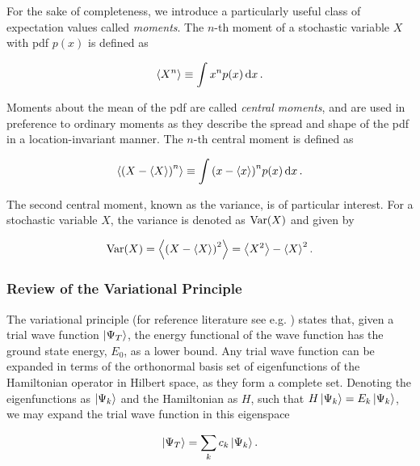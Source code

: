 For the sake of completeness, we introduce a particularly useful class of expectation values called \textit{moments}. The $n$-th moment of a stochastic variable $X$ with pdf $p(x)$ is defined as 

\begin{equation*}
    \expval{X^n} \equiv \int x^n p(x) \dd{x}.
\end{equation*}

Moments about the mean of the pdf are called \textit{central moments}, and are used in preference to ordinary moments as they describe the spread and shape of the pdf in a  location-invariant manner. The $n$-th central moment is defined as 

\begin{equation*}
    \expval{\qty(X - \expval{X})^n} \equiv \int \qty(x - \expval{x})^n p(x) \dd{x}.
\end{equation*}

The second central moment, known as the variance, is of particular interest. For a stochastic variable $X$, the variance is denoted as $\mathrm{Var} \qty(X)$ and given by 

\begin{equation}
    \mathrm{Var} \qty(X) =  \expval{\qty(X - \expval{X})^2} = \expval{X^2} - \expval{X}^2.
\end{equation}



\subsubsection{Review of the Variational Principle}\label{sec:variational_principle}

The variational principle (for reference literature see e.g. \cite{VMC}) states that, given a trial wave function $\ket{\Psi_T}$, the energy functional of the wave function has the ground state energy, $E_0$, as a lower bound. Any trial wave function can be expanded in terms of the orthonormal basis set of eigenfunctions of the Hamiltonian operator in Hilbert space, as they form a complete set. Denoting the eigenfunctions as $\ket{\Psi_k}$ and the Hamiltonian as $H$, such that $H\ket{\Psi_k}=E_k\ket{\Psi_k}$, we may expand the trial wave function in this eigenspace

\begin{equation*}
    \ket{\Psi_T} = \sum_{k}c_k\ket{\Psi_k}.
\end{equation*}

